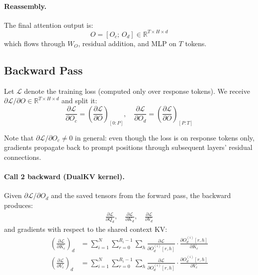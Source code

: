 \documentclass{article}
\begin{document}
\paragraph{Reassembly.} The final attention output is:
\begin{equation}
  O = [O_c;\, O_d] \in \mathbb{R}^{T \times H \times d}
\end{equation}
which flows through $W_O$, residual addition, and MLP on $T$ tokens.

\subsection{Backward Pass}

Let $\mathcal{L}$ denote the training loss (computed only over response tokens). We receive $\partial \mathcal{L}/\partial O \in \mathbb{R}^{T \times H \times d}$ and split it:
\begin{equation}
  \frac{\partial \mathcal{L}}{\partial O_c} = \left(\frac{\partial \mathcal{L}}{\partial O}\right)_{\![0:P]}, \quad
  \frac{\partial \mathcal{L}}{\partial O_d} = \left(\frac{\partial \mathcal{L}}{\partial O}\right)_{\![P:T]}
\end{equation}

Note that $\partial \mathcal{L}/\partial O_c \neq 0$ in general: even though the loss is on response tokens only, gradients propagate back to prompt positions through subsequent layers' residual connections.

\paragraph{Call 2 backward (DualKV kernel).} Given $\partial \mathcal{L}/\partial O_d$ and the saved tensors from the forward pass, the backward produces:
\begin{align}
  \frac{\partial \mathcal{L}}{\partial Q_d},\quad
  \frac{\partial \mathcal{L}}{\partial K_d},\quad
  \frac{\partial \mathcal{L}}{\partial V_d}
\end{align}
and gradients with respect to the shared context KV:
\begin{align}
  \left(\frac{\partial \mathcal{L}}{\partial K_c}\right)_{\!d} &= \sum_{i=1}^{N} \sum_{r=0}^{R_i - 1} \sum_{h} \frac{\partial \mathcal{L}}{\partial O_d^{(i)}[r,h]} \cdot \frac{\partial O_d^{(i)}[r,h]}{\partial K_c} \label{eq:dkc-dec} \\
  \left(\frac{\partial \mathcal{L}}{\partial V_c}\right)_{\!d} &= \sum_{i=1}^{N} \sum_{r=0}^{R_i - 1} \sum_{h} \frac{\partial \mathcal{L}}{\partial O_d^{(i)}[r,h]} \cdot \frac{\partial O_d^{(i)}[r,h]}{\partial V_c} \label{eq:dvc-dec}
\end{align}
\end{document}
